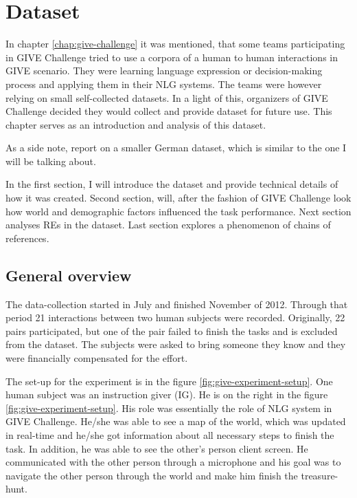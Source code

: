 \chapter{Dataset}
In chapter \ref{chap:give-challenge} it was mentioned, that some teams participating in GIVE Challenge tried to use a corpora of a human to human interactions in GIVE scenario. They were learning language expression or decision-making process and applying them in their NLG systems. The teams were however relying on small self-collected datasets. In a light of this, organizers of GIVE Challenge decided they would collect and provide dataset for future use. This chapter serves as an introduction and analysis of this dataset.

As a side note, \citet{striegnitz2012referring} report on a smaller German dataset, which is similar to the one I will be talking about. 

In the first section, I will introduce the dataset and provide technical details of how it was created. Second section, will, after the fashion of GIVE Challenge look how world and demographic factors influenced the task performance. Next section analyses REs in the dataset. Last section explores a phenomenon of chains of references.

\section{General overview}
The data-collection started in July and finished November of 2012. Through that period 21 interactions between two human subjects were recorded. Originally, 22 pairs participated, but one of the pair failed to finish the tasks and is excluded from the dataset. The subjects were asked to bring someone they know and they were financially compensated for the effort. 

The set-up for the experiment is in the figure \ref{fig:give-experiment-setup}. One human subject was an instruction giver (IG). He is on the right in the figure \ref{fig:give-experiment-setup}. His role was essentially the role of NLG system in GIVE Challenge. He/she was able to see a map of the world, which was updated in real-time and he/she got information about all necessary steps to finish the task. In addition, he was able to see the other's person client screen. He communicated with the other person through a microphone and his goal was to navigate the other person through the world and make him finish the treasure-hunt.

